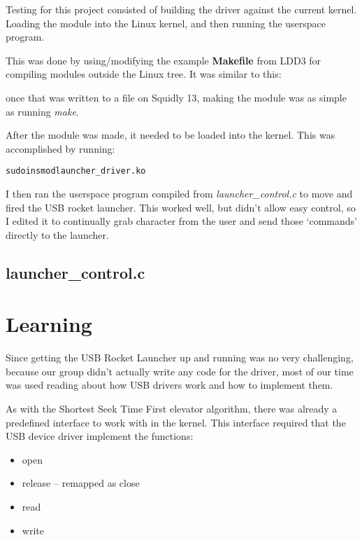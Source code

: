 \documentclass[letterpaper,10pt,titlepage]{article}
\begin{document}
Testing for this project consisted of building the driver against the current
kernel. Loading the module into the Linux kernel, and then running the
userspace program.

This was done by using/modifying the example \textbf{Makefile} from LDD3
for compiling modules outside the Linux tree. It was similar to this:



once that was written to a file on Squidly 13, making the module was as
simple as running \emph{make}.

After the module was made, it needed to be loaded into the kernel. This
was accomplished by running:

\begin{alltt}
sudo insmod launcher\_driver.ko
\end{alltt}

I then ran the userspace program compiled from \emph{launcher\_control.c}
to move and fired the USB rocket launcher. This worked well, but didn't
allow easy control, so I edited it to continually grab character from
the user and send those `commands' directly to the launcher.

\subsection*{launcher\_control.c}


\section*{Learning}

Since getting the USB Rocket Launcher up and running was no very
challenging, because our group didn't actually write any code for the
driver, most of our time was used reading about how USB drivers work and
how to implement them.

As with the Shortest Seek Time First elevator algorithm, there was
already a predefined interface to work with in the kernel. This
interface required that the USB device driver implement the functions:

\begin{itemize}
\item open
\item release -- remapped as close
\item read
\item write
\end{itemize}
\end{document}

